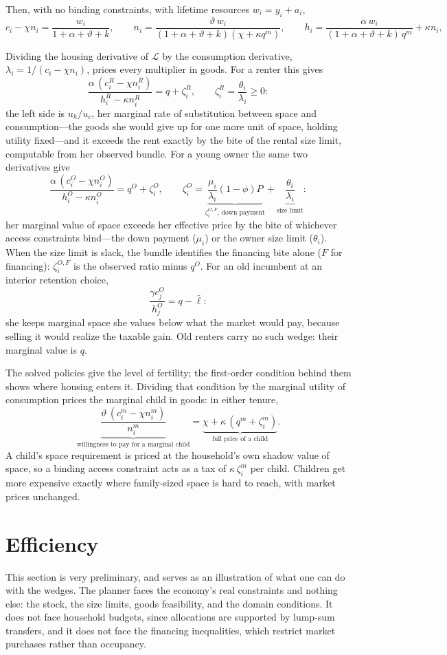 \documentclass[11pt]{article}
\begin{document}
Then, with no binding constraints, with lifetime resources $w_i=y_i+a_i$,
\[
c_i-\chi n_i=\frac{w_i}{1+\alpha+\vartheta+k},
\qquad
n_i=\frac{\vartheta\,w_i}{(1+\alpha+\vartheta+k)(\chi+\kappa q^m)},
\qquad
h_i=\frac{\alpha\,w_i}{(1+\alpha+\vartheta+k)\,q^m}+\kappa n_i,
\]


Dividing the housing derivative of $\mathcal L$ by the consumption derivative, $\lambda_i=1/(c_i-\chi n_i)$, prices every multiplier in goods. For a renter this gives
\[
\frac{\alpha\,(c_i^R-\chi n_i^R)}{h_i^R-\kappa n_i^R}=q+\zeta_i^R,
\qquad
\zeta_i^R=\frac{\theta_i}{\lambda_i}\ge0 :
\]
the left side is $u_h/u_c$, her marginal rate of substitution between space and consumption---the goods she would give up for one more unit of space, holding utility fixed---and it exceeds the rent exactly by the bite of the rental size limit, computable from her observed bundle. For a young owner the same two derivatives give
\[
\frac{\alpha\,(c_i^O-\chi n_i^O)}{h_i^O-\kappa n_i^O}=q^O+\zeta_i^O,
\qquad
\zeta_i^O=\underbrace{\frac{\mu_i}{\lambda_i}(1-\phi)P}_{\zeta_i^{O,F}\text{, down payment}}+\underbrace{\frac{\theta_i}{\lambda_i}}_{\text{size limit}} :
\]
her marginal value of space exceeds her effective price by the bite of whichever access constraints bind---the down payment ($\mu_i$) or the owner size limit ($\theta_i$). When the size limit is slack, the bundle identifies the financing bite alone ($F$ for financing): $\zeta_i^{O,F}$ is the observed ratio minus $q^O$. For an old incumbent at an interior retention choice,
\[
\frac{\gamma c_j^O}{h_j^O}=q-\bar\ell :
\]
she keeps marginal space she values below what the market would pay, because selling it would realize the taxable gain. Old renters carry no such wedge: their marginal value is $q$.

The solved policies give the level of fertility; the first-order condition behind them shows where housing enters it. Dividing that condition by the marginal utility of consumption prices the marginal child in goods: in either tenure,
\[
\underbrace{\frac{\vartheta\,(c_i^m-\chi n_i^m)}{n_i^m}}_{\text{willingness to pay for a marginal child}}
=\underbrace{\chi+\kappa\,(q^m+\zeta_i^m)}_{\text{full price of a child}} .
\]
A child's space requirement is priced at the household's own shadow value of space, so a binding access constraint acts as a tax of $\kappa\,\zeta_i^m$ per child. Children get more expensive exactly where family-sized space is hard to reach, with market prices unchanged.

\section{Efficiency}
This section is very preliminary, and serves as an illustration of what one can do with the wedges. 
The planner faces the economy's real constraints and nothing else: the stock, the size limits, goods feasibility, and the domain conditions. It does not face household budgets, since allocations are supported by lump-sum transfers, and it does not face the financing inequalities, which restrict market purchases rather than occupancy.
\end{document}
